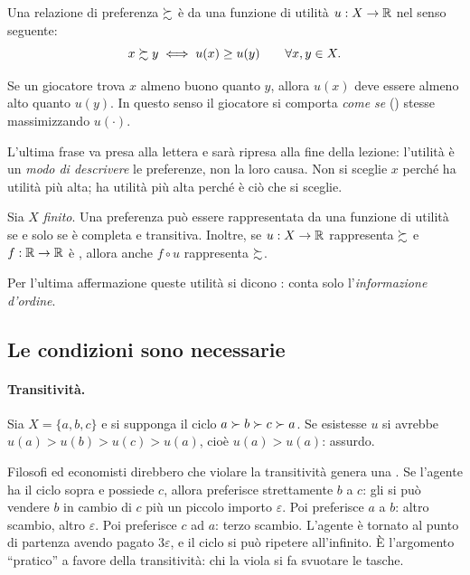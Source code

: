 \begin{definizione}
Una relazione di preferenza $\succsim$ è  da una funzione di utilità
$u : X \to \mathbb{R}$ nel senso seguente:
\[
  x \succsim y \iff u(x) \geq u(y) \qquad \forall x,y \in X.
\]
\end{definizione}

Se un giocatore trova $x$ almeno buono quanto $y$, allora $u(x)$ deve essere almeno
alto quanto $u(y)$. In questo senso il giocatore si comporta \emph{come se}
() stesse massimizzando $u(\cdot)$.

\begin{osservazione}
L'ultima frase va presa alla lettera e sarà ripresa alla fine della lezione: l'utilità
è un \emph{modo di descrivere} le preferenze, non la loro causa. Non si sceglie $x$
perché ha utilità più alta; ha utilità più alta perché è ciò che si sceglie.
\end{osservazione}

\begin{teorema}
Sia $X$ \emph{finito}. Una preferenza può essere rappresentata da una funzione di utilità
se e solo se è completa e transitiva. Inoltre, se $u : X \to \mathbb{R}$ rappresenta $\succsim$ e
$f : \mathbb{R} \to \mathbb{R}$ è , allora anche $f \circ u$ rappresenta $\succsim$.
\end{teorema}

Per l'ultima affermazione queste utilità si dicono : conta solo
l'\emph{informazione d'ordine}.

\subsection{Le condizioni sono necessarie}

\paragraph{Transitività.}
Sia $X = \{a,b,c\}$ e si supponga il ciclo $a \succ b \succ c \succ a$.
Se esistesse $u$ si avrebbe $u(a) > u(b) > u(c) > u(a)$, cioè $u(a) > u(a)$: assurdo.

\begin{extra}
Filosofi ed economisti direbbero che violare la transitività genera una
. Se l'agente ha il ciclo sopra e possiede $c$, allora preferisce
strettamente $b$ a $c$: gli si può vendere $b$ in cambio di $c$ più un piccolo
importo $\varepsilon$. Poi preferisce $a$ a $b$: altro scambio, altro $\varepsilon$.
Poi preferisce $c$ ad $a$: terzo scambio. L'agente è tornato al punto di partenza
avendo pagato $3\varepsilon$, e il ciclo si può ripetere all'infinito.
È l'argomento ``pratico'' a favore della transitività: chi la viola si fa svuotare le tasche.
\end{extra}

